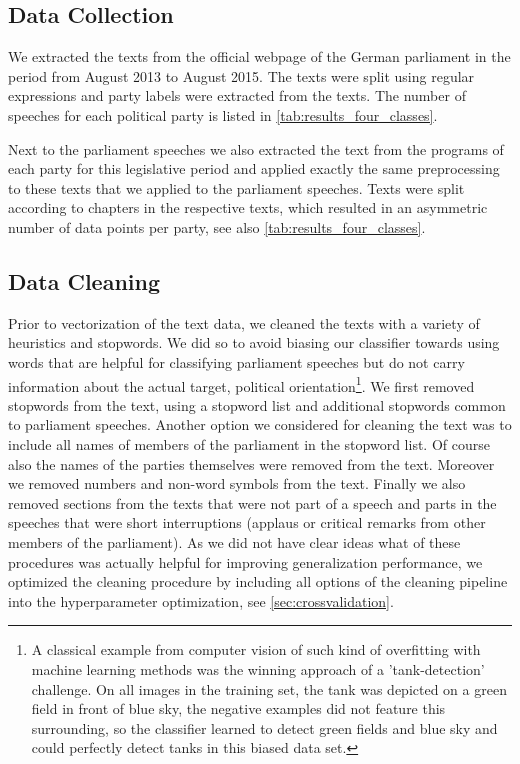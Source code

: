 \documentclass{article} %
\begin{document}
\subsection{Data Collection}\label{sec:collection}
We extracted the texts from the official webpage of the German parliament \cite{plenarprotokolle} in the period from August 2013 to August 2015. The texts were split using regular expressions and party labels were extracted from the texts. The number of speeches for each political party is listed in \autoref{tab:results_four_classes}. 

Next to the parliament speeches we also extracted the text from the programs of each party for this legislative period \cite{linke_parteiprogramm, gruene_parteiprogramm,spd_parteiprogramm, cdu_parteiprogramm} and applied exactly the same preprocessing to these texts that we applied to the parliament speeches. Texts were split according to chapters in the respective texts, which resulted in an asymmetric number of data points per party, see also \autoref{tab:results_four_classes}.


\subsection{Data Cleaning}\label{sec:cleaning}
Prior to vectorization of the text data, we cleaned the texts with a variety of heuristics and stopwords. We did so to avoid biasing our classifier towards using words that are helpful for classifying parliament speeches but do not carry information about the actual target, political orientation\footnote{A classical example from computer vision of such kind of overfitting with machine learning methods was the winning approach of a 'tank-detection' challenge. On all images in the training set, the tank was depicted on a green field in front of blue sky, the negative examples did not feature this surrounding, so the classifier learned to detect green fields and blue sky and could perfectly detect tanks in this biased data set.}. We first removed stopwords from the text, using a stopword list \cite{stopwords} and additional stopwords common to parliament speeches. Another option we considered for cleaning the text was to include all names of members of the parliament in the stopword list. Of course also the names of the parties themselves were removed from the text. Moreover we removed numbers and non-word symbols from the text. Finally we also removed sections from the texts that were not part of a speech and parts in the speeches that were short interruptions (applaus or critical remarks from other members of the parliament). As we did not have clear ideas what of these procedures was actually helpful for improving generalization performance, we optimized the cleaning procedure by including all options of the cleaning pipeline into the hyperparameter optimization, see \autoref{sec:crossvalidation}. 
\end{document}
